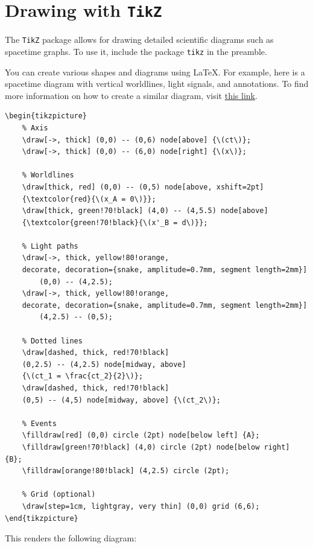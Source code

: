 \section{Drawing with \texttt{TikZ}}

The \texttt{TikZ} package allows for drawing detailed scientific diagrams such as spacetime graphs. To use it, include the package  \texttt{tikz} in the preamble.

You can create various shapes and diagrams using LaTeX. For example, here is a spacetime diagram with vertical worldlines, light signals, and annotations. To find more information on how to create a similar diagram, visit \href{https://tikz.net/relativity_minkowski_diagram/}{this link}.

\begin{verbatim}
\begin{tikzpicture}
    % Axis
    \draw[->, thick] (0,0) -- (0,6) node[above] {\(ct\)};
    \draw[->, thick] (0,0) -- (6,0) node[right] {\(x\)};
    
    % Worldlines
    \draw[thick, red] (0,0) -- (0,5) node[above, xshift=2pt] 
    {\textcolor{red}{\(x_A = 0\)}};
    \draw[thick, green!70!black] (4,0) -- (4,5.5) node[above] 
    {\textcolor{green!70!black}{\(x'_B = d\)}};
    
    % Light paths
    \draw[->, thick, yellow!80!orange, 
    decorate, decoration={snake, amplitude=0.7mm, segment length=2mm}]
        (0,0) -- (4,2.5);
    \draw[->, thick, yellow!80!orange, 
    decorate, decoration={snake, amplitude=0.7mm, segment length=2mm}]
        (4,2.5) -- (0,5);

    % Dotted lines
    \draw[dashed, thick, red!70!black] 
    (0,2.5) -- (4,2.5) node[midway, above] 
    {\(ct_1 = \frac{ct_2}{2}\)};
    \draw[dashed, thick, red!70!black] 
    (0,5) -- (4,5) node[midway, above] {\(ct_2\)};
    
    % Events
    \filldraw[red] (0,0) circle (2pt) node[below left] {A};
    \filldraw[green!70!black] (4,0) circle (2pt) node[below right] {B};
    \filldraw[orange!80!black] (4,2.5) circle (2pt);

    % Grid (optional)
    \draw[step=1cm, lightgray, very thin] (0,0) grid (6,6);
\end{tikzpicture}
\end{verbatim}

This renders the following diagram:

